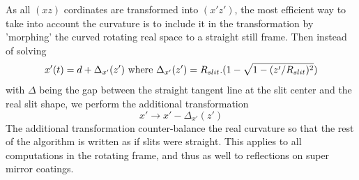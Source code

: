As all $(xz)$ cordinates are transformed into $(x'z')$, the most efficient way to take into account the curvature is to include it in the transformation by 'morphing' the curved rotating real space to a straight still frame. Then instead of solving
\begin{equation}x'(t) = d +\Delta_{x'}(z') {\rm\ where\ } \Delta_{x'}(z')=R_{slit}.(1-\sqrt{1-(z'/R_{slit})^2})
\end{equation}
with $\Delta$ being the gap between the straight tangent line at the slit center and the real slit shape, we perform the additional transformation
\begin{equation}
x' \rightarrow x' - \Delta_{x'}(z')
\end{equation}
The additional transformation counter-balance the real curvature so that the rest of the algorithm is written as if slits were straight.
This applies to all computations in the rotating frame, and thus as well to reflections on super mirror coatings.
